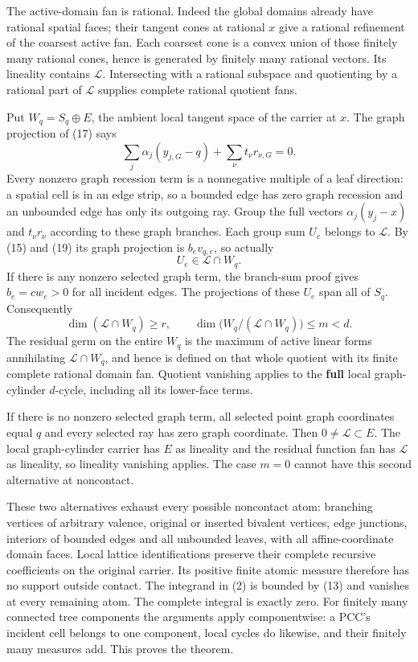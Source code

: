 \documentclass[
  11pt,
]{article}
\begin{document}
The active-domain fan is rational. Indeed the global domains already
have rational spatial faces; their tangent cones at rational \(x\) give
a rational refinement of the coarsest active fan. Each coarsest cone is
a convex union of those finitely many rational cones, hence is generated
by finitely many rational vectors. Its lineality contains
\(\mathcal L\). Intersecting with a rational subspace and quotienting by
a rational part of \(\mathcal L\) supplies complete rational quotient
fans.

Put \(W_q=S_q\oplus E\), the ambient local tangent space of the carrier
at \(x\). The graph projection of (17) says
\[\sum_j\alpha_j(y_{j,G}-q)+\sum_\nu t_\nu r_{\nu,G}=0. \tag{19}\] Every
nonzero graph recession term is a nonnegative multiple of a leaf
direction: a spatial cell is in an edge strip, so a bounded edge has
zero graph recession and an unbounded edge has only its outgoing ray.
Group the full vectors \(\alpha_j(y_j-x)\) and \(t_\nu r_\nu\) according
to these graph branches. Each group sum \(U_e\) belongs to
\(\mathcal L\). By (15) and (19) its graph projection is \(b_ev_{q,e}\),
so actually \[U_e\in\mathcal L\cap W_q.\] If there is any nonzero
selected graph term, the branch-sum proof gives \(b_e=cw_e>0\) for all
incident edges. The projections of these \(U_e\) span all of \(S_q\).
Consequently \[\dim(\mathcal L\cap W_q)\geq r,\qquad
\dim\bigl(W_q/(\mathcal L\cap W_q)\bigr)\leq m<d. \tag{20}\] The
residual germ on the entire \(W_q\) is the maximum of active linear
forms annihilating \(\mathcal L\cap W_q\), and hence is defined on that
whole quotient with its finite complete rational domain fan. Quotient
vanishing applies to the \textbf{full} local graph-cylinder \(d\)-cycle,
including all its lower-face terms.

If there is no nonzero selected graph term, all selected point graph
coordinates equal \(q\) and every selected ray has zero graph
coordinate. Then \(0\ne\mathcal L\subset E\). The local graph-cylinder
carrier has \(E\) as lineality and the residual function fan has
\(\mathcal L\) as lineality, so lineality vanishing applies. The case
\(m=0\) cannot have this second alternative at noncontact.

These two alternatives exhaust every possible noncontact atom: branching
vertices of arbitrary valence, original or inserted bivalent vertices,
edge junctions, interiors of bounded edges and all unbounded leaves,
with all affine-coordinate domain faces. Local lattice identifications
preserve their complete recursive coefficients on the original carrier.
Its positive finite atomic measure therefore has no support outside
contact. The integrand in (2) is bounded by (13) and vanishes at every
remaining atom. The complete integral is exactly zero. For finitely many
connected tree components the arguments apply componentwise: a PCC's
incident cell belongs to one component, local cycles do likewise, and
their finitely many measures add. This proves the theorem.
\end{document}
